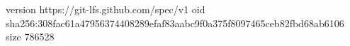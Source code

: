 version https://git-lfs.github.com/spec/v1
oid sha256:308fac61a47956374408289efaf83aabc9f0a375f8097465ceb82fbd68ab6106
size 786528
